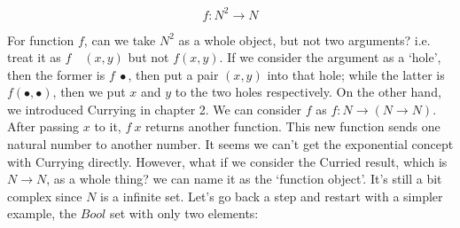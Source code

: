 \documentclass[b5paper]{article}
\begin{document}
\[
f : N^2 \to N
\]

For function $f$, can we take $N^2$ as a whole object, but not two arguments? i.e. treat it as $f\quad (x, y)$ but not $f(x, y)$. If we consider the argument as a `hole', then the former is $f\ \bullet$, then put a pair $(x, y)$ into that hole; while the latter is $f(\bullet, \bullet)$, then we put $x$ and $y$ to the two holes respectively. On the other hand, we introduced Currying in chapter 2. We can consider $f$ as $f: N \to (N \to N)$. After passing $x$ to it, $f\ x$ returns another function. This new function sends one natural number to another number. It seems we can't get the exponential concept with Currying directly. However, what if we consider the Curried result, which is $N \to N$, as a whole thing? we can name it as the `function object'. It's still a bit complex since $N$ is a infinite set. Let's go back a step and restart with a simpler example, the $Bool$ set with only two elements:
\end{document}
